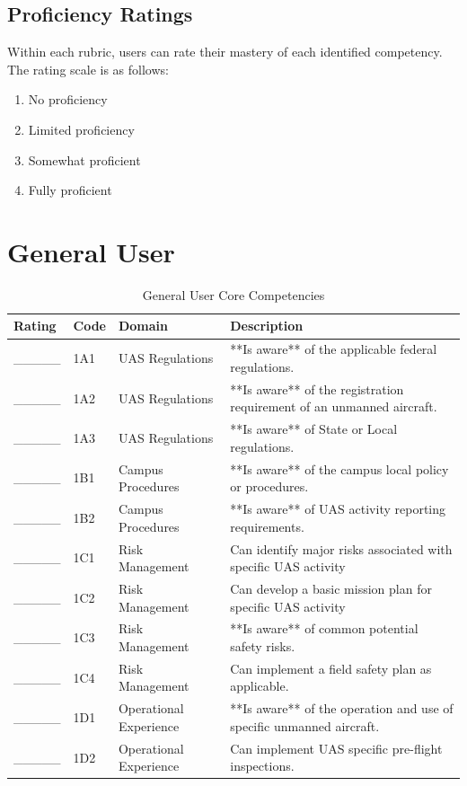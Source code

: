 \documentclass[
]{book}
\providecommand{\tightlist}{%
  \setlength{\itemsep}{0pt}\setlength{\parskip}{0pt}}
\begin{document}
\hypertarget{proficiency-ratings}{%
\subsection{Proficiency Ratings}\label{proficiency-ratings}}

Within each rubric, users can rate their mastery of each identified competency. The rating scale is as follows:

\begin{enumerate}
\def\labelenumi{\arabic{enumi}.}
\tightlist
\item
  No proficiency
\item
  Limited proficiency
\item
  Somewhat proficient
\item
  Fully proficient
\end{enumerate}

\hypertarget{general-user}{%
\section{General User}\label{general-user}}

\begin{longtable}[t]{lll>{\raggedright\arraybackslash}p{25em}}
\caption{\label{tab:unnamed-chunk-5}General User Core Competencies}\\
\toprule
Rating & Code & Domain & Description\\
\midrule
\_\_\_\_\_ & 1A1 & UAS Regulations & **Is aware** of the applicable federal regulations.\\
\_\_\_\_\_ & 1A2 & UAS Regulations & **Is aware** of the registration requirement of an unmanned aircraft.\\
\_\_\_\_\_ & 1A3 & UAS Regulations & **Is aware** of State or Local regulations.\\
\_\_\_\_\_ & 1B1 & Campus Procedures & **Is aware** of the campus local policy or procedures.\\
\_\_\_\_\_ & 1B2 & Campus Procedures & **Is aware** of UAS activity reporting requirements.\\
\addlinespace
\_\_\_\_\_ & 1C1 & Risk Management & Can identify major risks associated with specific UAS activity\\
\_\_\_\_\_ & 1C2 & Risk Management & Can develop a basic mission plan for specific UAS activity\\
\_\_\_\_\_ & 1C3 & Risk Management & **Is aware** of common potential safety risks.\\
\_\_\_\_\_ & 1C4 & Risk Management & Can implement a field safety plan as applicable.\\
\_\_\_\_\_ & 1D1 & Operational Experience & **Is aware** of the operation and use of specific unmanned aircraft.\\
\addlinespace
\_\_\_\_\_ & 1D2 & Operational Experience & Can implement UAS specific pre-flight inspections.\\
\bottomrule
\end{longtable}
\end{document}
